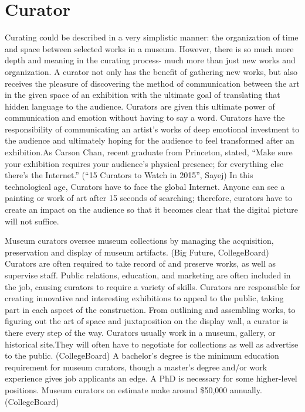 \chapter{Curator}

Curating could be described in a very simplistic manner: the organization of time and space between selected works in a museum. However, there is so much more depth and meaning in the curating process- much more than just new works and organization. A curator not only has the benefit of gathering new works, but also receives the pleasure of discovering the method of communication between the art in the given space of an exhibition with the ultimate goal of translating that hidden language to the audience. Curators are given this ultimate power of communication and emotion without having to say a word. Curators have the responsibility of communicating an artist’s works of deep emotional investment to the audience and ultimately hoping for the audience to feel transformed after an exhibition.As Carson Chan, recent graduate from Princeton, stated, “Make sure your exhibition requires your audience’s physical presence; for everything else there’s the Internet.” (“15 Curators to Watch in 2015”, Sayej) In this technological age, Curators have to face the global Internet. Anyone can see a painting or work of art after 15 seconds of searching; therefore, curators have to create an impact on the audience so that it becomes clear that the digital picture will not suffice. 

Museum curators oversee museum collections by managing the acquisition, preservation and display of museum artifacts. (Big Future, CollegeBoard) Curators are often required to take record of and preserve works, as well as supervise staff. Public relations, education, and marketing are often included in the job, causing curators to require a variety of skills. Curators are responsible for creating innovative and interesting exhibitions to appeal to the public, taking part in each aspect of the construction. From outlining and assembling works, to figuring out the art of space and juxtaposition on the display wall, a curator is there every step of the way. Curators usually work in a museum, gallery, or historical site.They will often have to negotiate for collections as well as advertise to the public. (CollegeBoard) A bachelor's degree is the minimum education requirement for museum curators, though a master's degree and/or work experience gives job applicants an edge. A PhD is necessary for some higher-level positions. Museum curators on estimate make around \$50,000 annually. (CollegeBoard)

